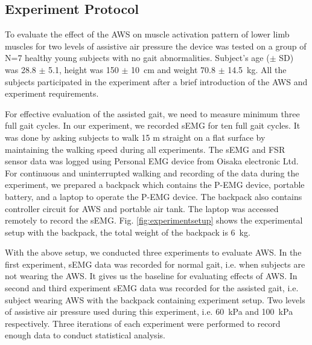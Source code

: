 \documentclass[letterpaper, 10 pt, conference]{ieeeconf}  %
\begin{document}
\subsection{Experiment Protocol}
To evaluate the effect of the AWS on muscle activation pattern of lower limb muscles for two levels of assistive air pressure the device was tested on a group of N=7 healthy young subjects with no gait abnormalities. Subject’s age ($\pm$ SD) was 28.8 $\pm$ 5.1, height was 150 $\pm$ \SI{10}{\centi\meter} and weight 70.8 $\pm$ \SI{14.5}{\kilogram}. All the subjects participated in the experiment after a brief introduction of the AWS and experiment requirements.

For effective evaluation of the assisted gait, we need to measure minimum three full gait cycles\cite{17}. In our experiment, we recorded sEMG for ten full gait cycles. It was done by asking subjects to walk 15 m straight on a flat surface by maintaining the walking speed during all experiments. The sEMG and FSR sensor data was logged using Personal EMG device from Oisaka electronic Ltd. For continuous and uninterrupted walking and recording of the data during the experiment, we prepared a backpack which contains the P-EMG device, portable battery, and a laptop to operate the P-EMG device. The backpack also contains controller circuit for AWS and portable air tank. The laptop was accessed remotely to record the sEMG. Fig. \ref{fig:experimentsetup} shows the experimental setup with the backpack, the total weight of the backpack is \SI{6}{\kilogram}. 


With the above setup, we conducted three experiments to evaluate AWS. In the first experiment, sEMG data was recorded for normal gait, i.e. when subjects are not wearing the AWS. It gives us the baseline for evaluating effects of AWS. In second and third experiment sEMG data was recorded for the assisted gait, i.e. subject wearing AWS with the backpack containing experiment setup. Two levels of assistive air pressure used during this experiment, i.e. \SI{60}{\kilo\pascal} and \SI{100}{\kilo\pascal} respectively. Three iterations of each experiment were performed to record enough data to conduct statistical analysis. 
\end{document}
